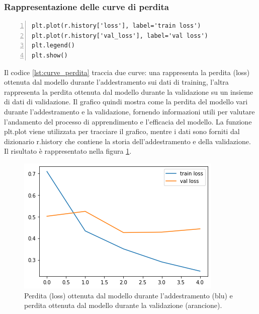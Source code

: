 \documentclass[a4paper,final,12pt]{report}
\begin{document}
\subsubsection{Rappresentazione delle curve di perdita}
\begin{lstlisting}[caption={Codice per il grafico delle curve di perdita.}, label={lst:curve_perdita}, breaklines, escapechar=`\%, frame=lines, basicstyle=\small\ttfamily, keepspaces=true, numbers=left]
plt.plot(r.history['loss'], label='train loss')
plt.plot(r.history['val_loss'], label='val loss')
plt.legend()
plt.show()
\end{lstlisting}
Il codice \ref{lst:curve_perdita} traccia due curve: una rappresenta la perdita (loss) ottenuta dal modello durante l'addestramento sui dati di training, l'altra rappresenta la perdita ottenuta dal modello durante la validazione su un insieme di dati di validazione. Il grafico quindi mostra come la perdita del modello vari durante l'addestramento e la validazione, fornendo informazioni utili per valutare l'andamento del processo di apprendimento e l'efficacia del modello. La funzione plt.plot viene utilizzata per tracciare il grafico, mentre i dati sono forniti dal dizionario r.history che contiene la storia dell'addestramento e della validazione. Il risultato è rappresentato nella figura \ref{figura:ssadasdc}.
\newpage
\begin{figure}[hbtp]
\centering
\includegraphics[scale=0.80]{img_concettuale/grpP.png}
\caption{Perdita (loss) ottenuta dal modello durante l'addestramento (blu) e perdita ottenuta dal modello durante la validazione (arancione).}
\label{figura:ssadasdc}
\end{figure}
\end{document}
